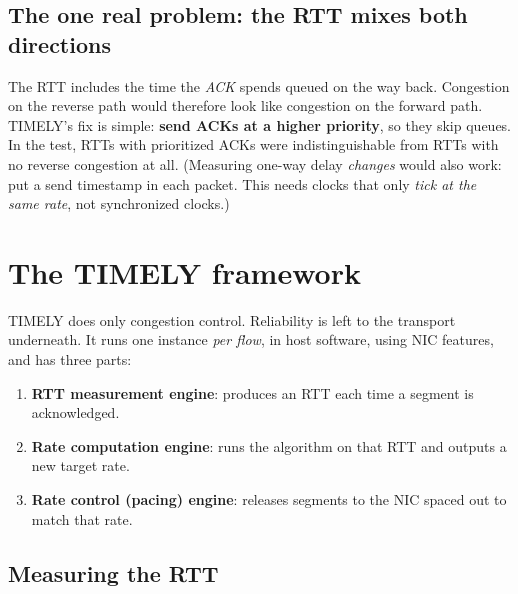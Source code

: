 \subsection{The one real problem: the RTT mixes both directions}
The RTT includes the time the \emph{ACK} spends queued on the way back. Congestion on the reverse path would therefore look like congestion on
the forward path. TIMELY's fix is simple: \textbf{send ACKs at a higher priority}, so they skip queues. In the test, RTTs with prioritized ACKs
were indistinguishable from RTTs with no reverse congestion at all. (Measuring one-way delay \emph{changes} would also work: put a send timestamp
in each packet. This needs clocks that only \emph{tick at the same rate}, not synchronized clocks.)

\section{The TIMELY framework}


TIMELY does only congestion control. Reliability is left to the transport underneath. It runs one instance \emph{per flow}, in host
software, using NIC features, and has three parts:
\begin{enumerate}
  \item \textbf{RTT measurement engine}: produces an RTT each time a segment is acknowledged.
  \item \textbf{Rate computation engine}: runs the algorithm on that RTT and outputs a new target rate.
  \item \textbf{Rate control (pacing) engine}: releases segments to the NIC spaced out to match that rate.
\end{enumerate}

\subsection{Measuring the RTT}

